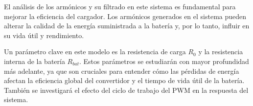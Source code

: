 El an\'alisis de los arm\'onicos y su filtrado en este sistema es fundamental para mejorar la eficiencia del cargador. Los arm\'onicos generados en el sistema pueden alterar la calidad de la energ\'ia suministrada a la bater\'ia y, por lo tanto, influir en su vida \'{u}til y rendimiento.

Un par\'ametro clave en este modelo es la resistencia de carga $R_0$ y la resistencia interna de la bater\'ia $R_{bat}$. Estos par\'ametros se estudiar\'an con mayor profundidad m\'as adelante, ya que son cruciales para entender c\'omo las p\'erdidas de energ\'ia afectan la eficiencia global del convertidor y el tiempo de vida \'{u}til de la bater\'ia. Tambi\'en se investigar\'a el efecto del ciclo de trabajo del PWM en la respuesta del sistema.
